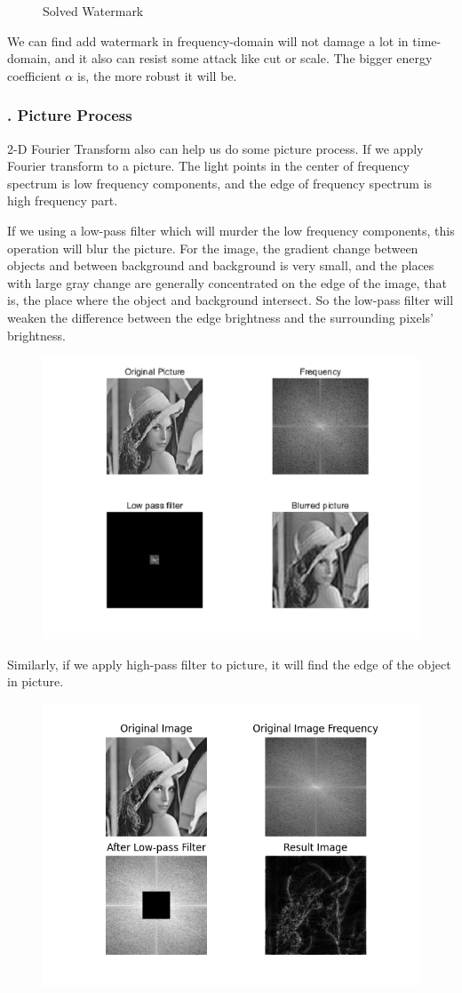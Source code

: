 \documentclass[margin,line]{res}
\begin{document}
\begin{resume}
\begin{figure}[H]
\begin{minipage}{0.5\linewidth}
		\caption*{Solved Watermark}
	\end{minipage}
\end{figure}
We can find add watermark in frequency-domain will not damage a lot in time-domain, and it also can resist some attack like cut or scale. The bigger energy coefficient $\alpha$ is, the more robust it will be.\par
\subsubsection{. Picture Process}
2-D Fourier Transform also can help us do some picture process. If we apply Fourier transform to a picture. The light points in the center of frequency spectrum is low frequency components, and the edge of frequency spectrum is high frequency part. \par
If we using a low-pass filter which will murder the low frequency components, this operation will blur the picture. For the image, the gradient change between objects and between background and background is very small, and the places with large gray change are generally concentrated on the edge of the image, that is, the place where the object and background intersect. So the low-pass filter will weaken the difference between the edge brightness and the surrounding pixels' brightness.
\begin{figure}[H]
	\includegraphics[width=0.8\linewidth]{figure/pic_process/blur.png}
\end{figure}
Similarly, if we apply high-pass filter to picture, it will find the edge of the object in picture.
\begin{figure}[H]
	\includegraphics[width=0.8\linewidth]{figure/pic_process/edge.png}

\end{figure}
\end{resume}
\end{document}
